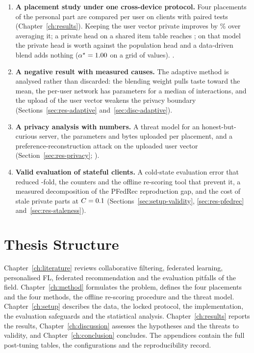 \begin{enumerate}[label=C\arabic*, leftmargin=2.5em]
  \item \textbf{A placement study under one cross-device protocol.} Four placements of the
        personal part are compared per user on \DsUsers{} clients with paired tests
        (Chapter~\ref{ch:results}). Keeping the user vector private improves \ndcg{} by
        \GainPersonalizedVsBaselinePct\% over averaging it; a private head on a shared item table
        reaches \NdcgPfedrec; on that model the private head is worth \AbsDeltaHeadGlobalHead{}
        \ndcg{} against the population head and a data-driven blend adds nothing
        ($\alpha^\star=1.00$ on a grid of \HeadAlphaGridSize{} values).
        .
  \item \textbf{A negative result with measured causes.} The adaptive method is analysed rather
        than discarded: the blending weight pulls taste toward the mean, the per-user network has
        \ParamsPersonalMlp{} parameters for a median of \DsMedianRatings{} interactions, and the
        upload of the user vector weakens the privacy boundary (Sections~\ref{sec:res-adaptive}
        and~\ref{sec:disc-adaptive}).
  \item \textbf{A privacy analysis with numbers.} A threat model for an honest-but-curious
        server, the parameters and bytes uploaded per placement, and a preference-reconstruction
        attack on the uploaded user vector (Section~\ref{sec:res-privacy};
        ).
  \item \textbf{Valid evaluation of stateful clients.} A cold-state evaluation error that
        reduced \ndcg{} \ColdEvalRatio-fold, the counters and the offline re-scoring tool that
        prevent it, a measured decomposition of the PFedRec reproduction gap, and the cost of
        stale private parts at $C=0.1$ (Sections~\ref{sec:setup-validity},
        \ref{sec:res-pfedrec} and~\ref{sec:res-staleness}).
\end{enumerate}

\section{Thesis Structure}
\label{sec:intro-structure}

Chapter~\ref{ch:literature} reviews collaborative filtering, federated learning, personalised FL,
federated recommendation and the evaluation pitfalls of the field. Chapter~\ref{ch:method}
formulates the problem, defines the four placements and the four methods, the offline re-scoring
procedure and the threat model. Chapter~\ref{ch:setup} describes the data, the locked protocol,
the implementation, the evaluation safeguards and the statistical analysis.
Chapter~\ref{ch:results} reports the results, Chapter~\ref{ch:discussion} assesses the
hypotheses and the threats to validity, and Chapter~\ref{ch:conclusion} concludes. The
appendices contain the full post-tuning tables, the configurations and the reproducibility
record.
